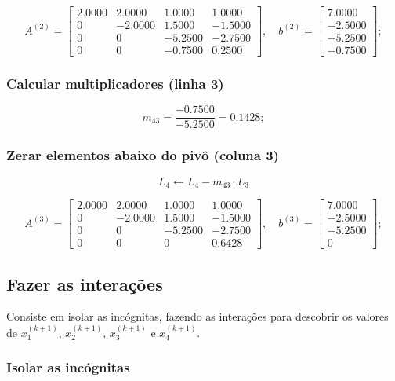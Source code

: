 \documentclass[12pt,a4paper]{article}
\begin{document}
\[
A^{(2)} = \begin{bmatrix}
2.0000 & 2.0000 & 1.0000 & 1.0000 \\
0 & -2.0000 & 1.5000 & -1.5000 \\
0 & 0 & -5.2500 & -2.7500 \\
0 & 0 & -0.7500 & 0.2500
\end{bmatrix},
\quad
b^{(2)} = \begin{bmatrix}
7.0000 \\ -2.5000 \\ -5.2500 \\ -0.7500
\end{bmatrix};
\]

\subsubsection{Calcular multiplicadores (linha 3)}

\[
m_{43} = \frac{-0.7500}{-5.2500} = 0.1428;
\]

\subsubsection{Zerar elementos abaixo do pivô (coluna 3)}

\[
L_4 \leftarrow L_4 - m_{43} \cdot L_3
\]

\[
A^{(3)} = \begin{bmatrix}
2.0000 & 2.0000 & 1.0000 & 1.0000 \\
0 & -2.0000 & 1.5000 & -1.5000 \\
0 & 0 & -5.2500 & -2.7500 \\
0 & 0 & 0 & 0.6428
\end{bmatrix},
\quad
b^{(3)} = \begin{bmatrix}
7.0000 \\ -2.5000 \\ -5.2500 \\ 0
\end{bmatrix};
\]

\subsection{Fazer as interações}

Consiste em isolar as incógnitas, fazendo as interações para descobrir os valores de $x_1^{(k+1)}$, $x_2^{(k+1)}$, $x_3^{(k+1)}$ e $x_4^{(k+1)}$.

\subsubsection{Isolar as incógnitas}
\end{document}
